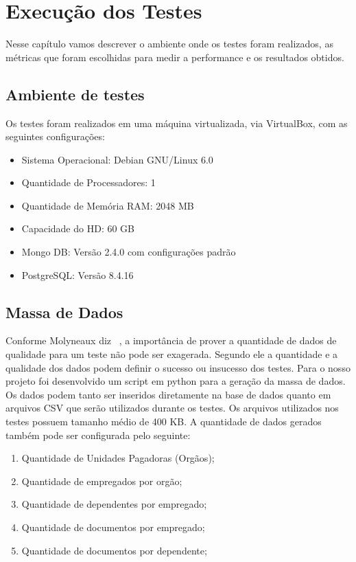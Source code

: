 \chapter {Execução dos Testes}

Nesse capítulo vamos descrever o ambiente onde os testes foram realizados, as métricas que foram escolhidas para medir a performance e os resultados obtidos.

\section{Ambiente de testes}

Os testes foram realizados em uma máquina virtualizada, via VirtualBox, com as seguintes configurações:

\begin{itemize}
\item Sistema Operacional: Debian GNU/Linux 6.0
\item Quantidade de Processadores: 1 
\item Quantidade de Memória RAM: 2048 MB
\item Capacidade do HD: 60 GB
\item Mongo DB: Versão 2.4.0 com configurações padrão
\item PostgreSQL: Versão 8.4.16
\end{itemize}

\section{Massa de Dados}

Conforme Molyneaux diz ~\cite{theartoftestperf}, a importância de prover a quantidade de dados de qualidade para um teste não pode ser exagerada. Segundo ele a quantidade e a qualidade dos dados podem definir o sucesso ou insucesso dos testes. Para o nosso projeto foi desenvolvido um script em python para a geração da massa de dados. Os dados podem tanto ser inseridos diretamente na base de dados quanto em arquivos CSV que serão utilizados durante os testes. Os arquivos utilizados nos testes possuem tamanho médio de 400 KB. A quantidade de dados gerados também pode ser configurada pelo seguinte:

\begin{enumerate}
	\item Quantidade de Unidades Pagadoras (Orgãos);
	\item Quantidade de empregados por orgão;
	\item Quantidade de dependentes por empregado;
	\item Quantidade de documentos por empregado;
	\item Quantidade de documentos por dependente;
\end{enumerate}

